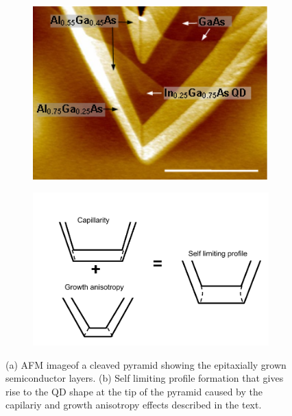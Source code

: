 \documentclass[12pt, twoside]{article}
\numberwithin{equation}{section}
\begin{document}
\begin{figure}[h!]
\centering
\begin{subfigure}{.5\textwidth}
  \centering
  \includegraphics[width=1\textwidth]{images/layers.png}
  \caption{}
  \label{fig:sub1}
\end{subfigure}%
\begin{subfigure}{.5\textwidth}
  \centering
  \includegraphics[width=1\textwidth]{images/selflim.pdf}
  \caption{}
  \label{fig:decaypath}
\end{subfigure}
\caption[]{(a)  AFM image\protect\footnotemark  of a cleaved pyramid showing the epitaxially grown semiconductor layers. (b) Self limiting profile formation that gives rise to the QD shape at the tip of the pyramid caused by the capilariy and growth anisotropy effects described in the text.}
\label{fig:afmlayers}
\end{figure}
\end{document}
